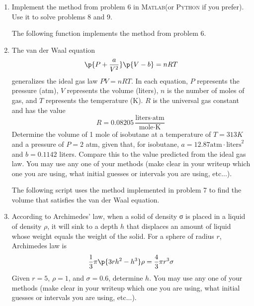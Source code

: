 \documentclass[11pt, oneside]{article}
\newcommand{\MATLAB}{\textsc{Matlab}\xspace}
\newcommand{\PYTHON}{\textsc{Python}\xspace}
\begin{document}
\begin{enumerate}
  \item %
    Implement the method from problem 6 in \MATLAB (or \PYTHON if you prefer).
    Use it to solve problems 8 and 9.

    The following function implements the method from problem 6.
    

  \item %
    The van der Waal equation
    \[
      \p{P + \frac{a}{V^2}}\p{V - b} = nRT
    \]
    generalizes the ideal gas law $PV = nRT$.
    In each equation, $P$ represents the pressure (atm), $V$ represents the volume
    (liters), $n$ is the number of moles of gas, and $T$ represents the temperature
    (K).
    $R$ is the universal gas constant and has the value
    \[
      R = 0.08205 \frac{\text{liters} \cdot \text{atm}}{\text{mole}\cdot \text{K}}
    \]
    Determine the volume of 1 mole of isobutane at a temperature of $T = 313 K$ and
    a pressure of $P = 2$ atm, given that, for isobutane,
    $a = 12.87 \text{atm} \cdot \text{liters}^2$ and $b = 0.1142$ liters.
    Compare this to the value predicted from the ideal gas law.
    You may use any one of your methods (make clear in your writeup which one
    you are using, what initial guesses or intervals you are using, etc...).

    The following script uses the method implemented in problem 7 to find the
    volume that satisfies the van der Waal equation.
    

  \item %
    According to Archimedes’ law, when a solid of density σ is placed in a
    liquid of density $\rho$, it will sink to a depth $h$ that displaces an
    amount of liquid whose weight equals the weight of the solid.
    For a sphere of radius $r$, Archimedes law is
    \[
      \frac{1}{3} \pi \p{3rh^2 - h^3}\rho = \frac{4}{3}\pi r^3 \sigma
    \]
    Given $r = 5$, $\rho = 1$, and $\sigma = 0.6$, determine $h$.
    You may use any one of your methods (make clear in your writeup which one
    you are using, what initial guesses or intervals you are using, etc...).
    

\end{enumerate}
\end{document}
